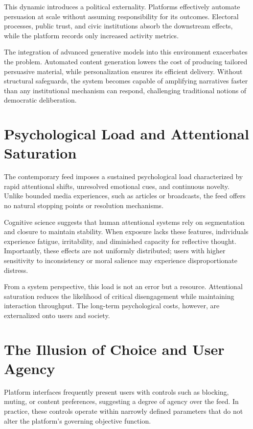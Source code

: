\documentclass[12pt]{article}
\begin{document}
This dynamic introduces a political externality. Platforms effectively automate persuasion at scale without assuming responsibility for its outcomes. Electoral processes, public trust, and civic institutions absorb the downstream effects, while the platform records only increased activity metrics.

The integration of advanced generative models into this environment exacerbates the problem. Automated content generation lowers the cost of producing tailored persuasive material, while personalization ensures its efficient delivery. Without structural safeguards, the system becomes capable of amplifying narratives faster than any institutional mechanism can respond, challenging traditional notions of democratic deliberation.

\section{Psychological Load and Attentional Saturation}

The contemporary feed imposes a sustained psychological load characterized by rapid attentional shifts, unresolved emotional cues, and continuous novelty. Unlike bounded media experiences, such as articles or broadcasts, the feed offers no natural stopping points or resolution mechanisms.

Cognitive science suggests that human attentional systems rely on segmentation and closure to maintain stability. When exposure lacks these features, individuals experience fatigue, irritability, and diminished capacity for reflective thought. Importantly, these effects are not uniformly distributed; users with higher sensitivity to inconsistency or moral salience may experience disproportionate distress.

From a system perspective, this load is not an error but a resource. Attentional saturation reduces the likelihood of critical disengagement while maintaining interaction throughput. The long-term psychological costs, however, are externalized onto users and society.

\section{The Illusion of Choice and User Agency}

Platform interfaces frequently present users with controls such as blocking, muting, or content preferences, suggesting a degree of agency over the feed. In practice, these controls operate within narrowly defined parameters that do not alter the platform's governing objective function.
\end{document}
